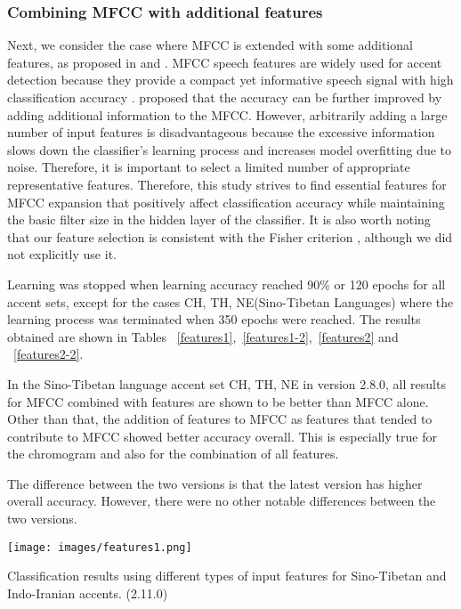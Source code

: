 \documentclass[ams]{U-AizuGT}
\begin{document}
\subsubsection{Combining MFCC with additional features}
Next, we consider the case where MFCC is extended with some additional features, as proposed in \cite{Veranika:lang} and \cite{Singh:fea}. MFCC speech features are widely used for accent detection because they provide a compact yet informative speech signal with high classification accuracy \cite{Jiang:tow,Jiang:tow}. proposed that the accuracy can be further improved by adding additional information to the MFCC. However, arbitrarily adding a large number of input features is disadvantageous because the excessive information slows down the classifier's learning process and increases model overfitting due to noise. Therefore, it is important to select a limited number of appropriate representative features. Therefore, this study strives to find essential features for MFCC expansion that positively affect classification accuracy while maintaining the basic filter size in the hidden layer of the classifier. It is also worth noting that our feature selection is consistent with the Fisher criterion \cite{Longford:afa, Wu:fea, Sun:fea}, although we did not explicitly use it.\par
Learning was stopped when learning accuracy reached 90\% or 120 epochs for all accent sets, except for the cases {CH, TH, NE}(Sino-Tibetan Languages) where the learning process was terminated when 350 epochs were reached. The results obtained are shown in Tables ~\ref{features1},~\ref{features1-2},~\ref{features2} and ~\ref{features2-2}.\par
In the Sino-Tibetan language accent set {CH, TH, NE} in version 2.8.0, all results for MFCC combined with features are shown to be better than MFCC alone. Other than that, the addition of features to MFCC as features that tended to contribute to MFCC showed better accuracy overall. This is especially true for the chromogram and also for the combination of all features.\par
The difference between the two versions is that the latest version has higher overall accuracy. However, there were no other notable differences between the two versions.
\begin{table}[h]
    \centering
    \texttt{[image: images/features1.png]}
    \caption{Classification results using different types of input features for Sino-Tibetan and Indo-Iranian accents. (2.11.0)}
    \label{features1}
\end{table}
\end{document}
